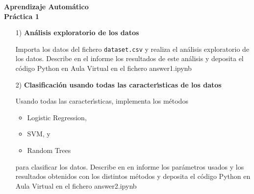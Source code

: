 \documentclass{article}
\begin{document}
\begin{center}
\bf{\large 
{\Large Aprendizaje Autom\'atico}\\
{\vspace{0.1cm}}
Pr\'actica 1
}
\end{center}


\begin{itemize}

\item[1)]  {\bf An\'alisis exploratorio de los datos}

Importa los datos del fichero \texttt{dataset.csv} y realiza el an\'alisis exploratorio de los datos. Describe en el informe los resultados de este análisis y deposita el c\'odigo Python en Aula Virtual en el fichero answer1.ipynb

\end{itemize}


\begin{itemize}

\item[2)] {\bf Clasificaci\'on usando todas las caracter\'{\i}sticas de los datos}

Usando todas las caracter\'{\i}sticas, implementa los m\'etodos 

\begin{itemize}

\item
Logistic Regression, 

\item
SVM, y

\item
Random Trees


\end{itemize}

para clasificar los datos. Describe en en informe los par\'ametros usados y los resultados obtenidos con los distintos m\'etodos y deposita el c\'odigo Python en Aula Virtual en el fichero answer2.ipynb

\end{itemize}
\end{document}
